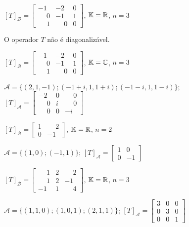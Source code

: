 \documentclass[12pt]{exam}
\begin{document}
\begin{exercicio}
    $[T]_\mathcal{B} = \begin{bmatrix} -1 & -2 & 0\\ \phantom{-} 0 & -1 & 1\\ \phantom{-} 1 & \phantom{-} 0 & 0\end{bmatrix}$, $\mathbb{K} = \mathbb{R}$, $n = 3$

    \begin{solucao}
        O operador $T$ não é diagonalizável.
    \end{solucao}
\end{exercicio}

\begin{exercicio}
    $[T]_\mathcal{B} = \begin{bmatrix} -1 & -2 & 0\\ \phantom{-} 0 & -1 & 1\\ \phantom{-} 1 & \phantom{-} 0 & 0\end{bmatrix}$, $\mathbb{K} = \mathbb{C}$, $n = 3$

    \begin{solucao}
        $\mathcal{A} = \{(2,1,-1);(-1 + i, 1, 1 + i);(-1 - i, 1, 1 - i)\}$; $[T]_\mathcal{A} = \begin{bmatrix} -2 & 0 & \phantom{-} 0\\ \phantom{-} 0 & i & \phantom{-} 0\\ \phantom{-} 0 & 0 & -i\end{bmatrix}$
    \end{solucao}
\end{exercicio}

\begin{exercicio}
    $[T]_\mathcal{B} = \begin{bmatrix} 1 & \phantom{-} 2\\ 0 & -1\end{bmatrix}$, $\mathbb{K} = \mathbb{R}$, $n = 2$

    \begin{solucao}
        $\mathcal{A} = \{(1,0);(-1,1)\}$; $[T]_\mathcal{A} = \begin{bmatrix} 1 & 0\\ 0 & -1\end{bmatrix}$
    \end{solucao}
\end{exercicio}

\begin{exercicio}
    $[T]_\mathcal{B} = \begin{bmatrix} \phantom{-} 1 & 2 & \phantom{-} 2\\ \phantom{-} 1 & 2 & -1\\ -1 & 1 & \phantom{-} 4\end{bmatrix}$, $\mathbb{K} = \mathbb{R}$, $n = 3$

    \begin{solucao}
        $\mathcal{A} = \{(1,1,0);(1,0,1);(2,1,1)\}$; $[T]_\mathcal{A} = \begin{bmatrix} 3 & 0 & 0\\ 0 & 3 & 0\\ 0 & 0 & 1\end{bmatrix}$
    \end{solucao}
\end{exercicio}
\end{document}
